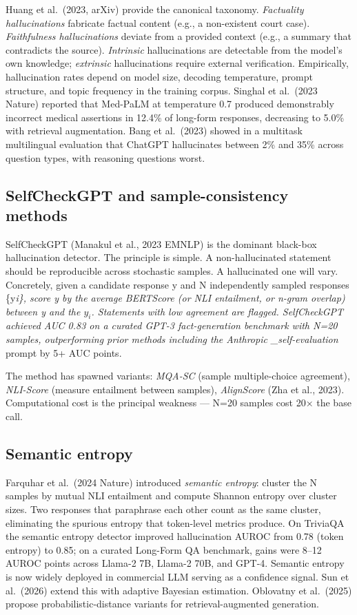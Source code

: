 Huang et al.~(2023, arXiv) provide the canonical taxonomy. \emph{Factuality hallucinations} fabricate factual content (e.g., a non-existent court case). \emph{Faithfulness hallucinations} deviate from a provided context (e.g., a summary that contradicts the source). \emph{Intrinsic} hallucinations are detectable from the model's own knowledge; \emph{extrinsic} hallucinations require external verification. Empirically, hallucination rates depend on model size, decoding temperature, prompt structure, and topic frequency in the training corpus. Singhal et al.~(2023 Nature) reported that Med-PaLM at temperature 0.7 produced demonstrably incorrect medical assertions in 12.4\% of long-form responses, decreasing to 5.0\% with retrieval augmentation. Bang et al.~(2023) showed in a multitask multilingual evaluation that ChatGPT hallucinates between 2\% and 35\% across question types, with reasoning questions worst.

\subsection{SelfCheckGPT and sample-consistency methods}\label{selfcheckgpt-and-sample-consistency-methods}

SelfCheckGPT (Manakul et al., 2023 EMNLP) is the dominant black-box hallucination detector. The principle is simple. A non-hallucinated statement should be reproducible across stochastic samples. A hallucinated one will vary. Concretely, given a candidate response y and N independently sampled responses \{y\emph{i\}, score y by the average BERTScore (or NLI entailment, or n-gram overlap) between y and the \(y_i\). Statements with low agreement are flagged. SelfCheckGPT achieved AUC 0.83 on a curated GPT-3 fact-generation benchmark with N=20 samples, outperforming prior methods including the Anthropic \_self-evaluation} prompt by 5+ AUC points.

The method has spawned variants: \emph{MQA-SC} (sample multiple-choice agreement), \emph{NLI-Score} (measure entailment between samples), \emph{AlignScore} (Zha et al., 2023). Computational cost is the principal weakness --- N=20 samples cost 20× the base call.

\subsection{Semantic entropy}\label{semantic-entropy}

Farquhar et al.~(2024 Nature) introduced \emph{semantic entropy}: cluster the N samples by mutual NLI entailment and compute Shannon entropy over cluster sizes. Two responses that paraphrase each other count as the same cluster, eliminating the spurious entropy that token-level metrics produce. On TriviaQA the semantic entropy detector improved hallucination AUROC from 0.78 (token entropy) to 0.85; on a curated Long-Form QA benchmark, gains were 8--12 AUROC points across Llama-2 7B, Llama-2 70B, and GPT-4. Semantic entropy is now widely deployed in commercial LLM serving as a confidence signal. Sun et al.~(2026) extend this with adaptive Bayesian estimation. Oblovatny et al.~(2025) propose probabilistic-distance variants for retrieval-augmented generation.

